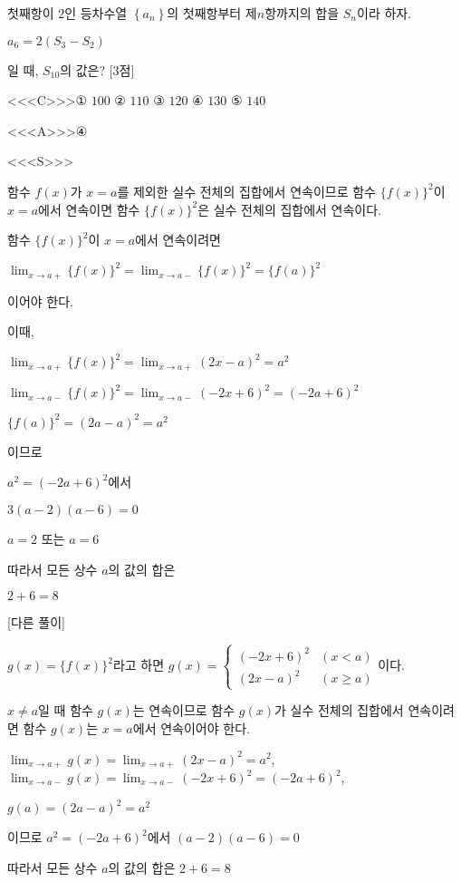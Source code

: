 \documentclass{oblivoir}
\begin{document}
첫째항이 $2$인 등차수열 $\left\{a_{n}\right\}$의 첫째항부터 제$n$항까지의 합을 $S_{n}$이라 하자.

$a_{6}= 2(S_{3}-S_{2})$

일 때, $S_{10}$의 값은? [3점]

<<<C>>>① $100$ ② $110$ ③ $120$ ④ $130$ ⑤ $140$

<<<A>>>④

<<<S>>>

함수 $f(x)$가 $x=a$를 제외한 실수 전체의 집합에서 연속이므로 함수 $\{f(x)\}^{2}$이 $x=a$에서 연속이면 함수 $\{f(x)\}^{2}$은 실수 전체의 집합에서 연속이다.

함수 $\{f(x)\}^{2}$이 $x=a$에서 연속이려면 

$\displaystyle\lim_{x\to a+}\{f(x)\}^{2}=\displaystyle\lim_{x\to a-}\{f(x)\}^{2}=\{f(a)\}^{2}$

이어야 한다.

이때,

$\displaystyle\lim_{x\to a+}\{f(x)\}^{2}=\displaystyle\lim_{x\to a+}(2x-a)^{2}=a^{2}$

$\displaystyle\lim_{x\to a-}\{f(x)\}^{2}=\displaystyle\lim_{x\to a-}(-2x+6)^{2}=(-2a+6)^{2}$

$\{f(a)\}^{2}=(2a-a)^{2}=a^{2}$

이므로

$a^{2}=(-2a+6)^{2}$에서

$3(a-2)(a-6)=0$

$a=2$ 또는 $a=6$

따라서 모든 상수 $a$의 값의 합은

$2+6=8$

[다른 풀이]

$g(x)=\{f(x)\}^{2}$라고 하면 $g(x)=\begin{cases}
(-2x+6)^{2}&(x< a)\\
(2x-a)^{2}&(x\ge a)
\end{cases}$이다.

$x\ne a$일 때 함수 $g(x)$는 연속이므로 함수 $g(x)$가 실수 전체의 집합에서 연속이려면 함수 $g(x)$는 $x=a$에서 연속이어야 한다.

$\displaystyle\lim_{x\rightarrow a+}g(x)=\displaystyle\lim_{x\rightarrow a+}(2x-a)^{2}=a^{2}$, $\displaystyle\lim_{x\rightarrow a-}g(x)=\displaystyle\lim_{x\rightarrow a-}(-2x+6)^{2}=(-2a+6)^{2}$, 

$g(a)=(2a-a)^{2}=a^{2}$

이므로 $a^{2}=(-2a+6)^{2}$에서 $(a-2)(a-6)=0$

따라서 모든 상수 $a$의 값의 합은 $2+6=8$
\end{document}
